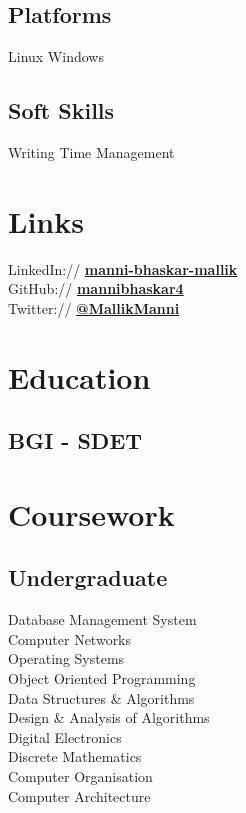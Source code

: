 \documentclass[]{deedy-resume-openfont}
\begin{document}
\begin{minipage}[t]{0.33\textwidth}
\subsection{Platforms}
Linux \textbullet{} Windows 
\sectionsep

\subsection{Soft Skills}
 Writing \textbullet{} Time Management
\sectionsep


\section{Links} 
LinkedIn://  \href{https://www.linkedin.com/in/manni-bhaskar-mallik-ba54001a3/}{\bf manni-bhaskar-mallik} \\
GitHub://  \href{https://github.com/mannibhaskar4}{\bf mannibhaskar4} \\
Twitter://  \href{https://twitter.com/MallikManni}{\bf @MallikManni} \\
\sectionsep


\section{Education} 

\subsection{BGI - SDET}
\sectionsep


\section{Coursework}

\subsection{Undergraduate}
\sectionsep
Database Management System \\
Computer Networks \\
Operating Systems \\
Object Oriented Programming \\
Data Structures \& Algorithms \\
Design \& Analysis of Algorithms \\
Digital Electronics \\
Discrete Mathematics \\
Computer Organisation \\
Computer Architecture \\


\end{minipage}
\end{document}
